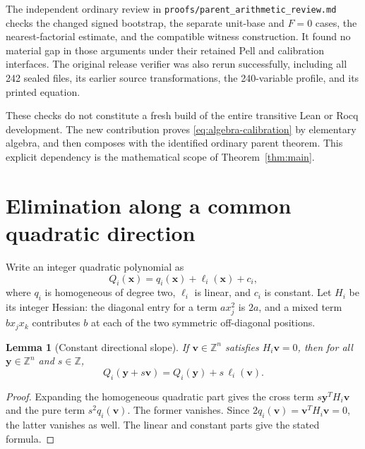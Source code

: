 \documentclass[10pt,letterpaper]{article}
\newtheorem{lemma}[theorem]{Lemma}
\theoremstyle{definition}\newtheorem{remark}[theorem]{Remark}
\newcommand{\Z}{\mathbb Z}\newcommand{\Q}{\mathbb Q}\newcommand{\N}{\mathbb N}
\begin{document}
The independent ordinary review in
\nolinkurl{proofs/parent_arithmetic_review.md} checks the changed signed
bootstrap, the separate unit-base and $F=0$ cases, the nearest-factorial
estimate, and the compatible witness construction. It found no material
gap in those arguments under their retained Pell and calibration
interfaces. The original release verifier was also rerun successfully,
including all 242 sealed files, its earlier source transformations, the
240-variable profile, and its printed equation.

These checks do not constitute a fresh build of the entire transitive
Lean or Rocq development. The new contribution proves
\eqref{eq:algebra-calibration} by elementary algebra, and then composes
with the identified ordinary parent theorem. This explicit dependency is
the mathematical scope of Theorem~\ref{thm:main}.

\section{Elimination along a common quadratic direction}

Write an integer quadratic polynomial as
\[
 Q_i(\boldsymbol x)=q_i(\boldsymbol x)+\ell_i(\boldsymbol x)+c_i,
\]
where $q_i$ is homogeneous of degree two, $\ell_i$ is linear, and $c_i$
is constant. Let $H_i$ be its integer Hessian: the diagonal entry for a
term $a x_j^2$ is $2a$, and a mixed term $b x_jx_k$ contributes $b$ at
each of the two symmetric off-diagonal positions.

\begin{lemma}[Constant directional slope]\label{lem:direction}
If $\boldsymbol v\in\Z^n$ satisfies $H_i\boldsymbol v=0$, then for all
$\boldsymbol y\in\Z^n$ and $s\in\Z$,
\[
 Q_i(\boldsymbol y+s\boldsymbol v)
      =Q_i(\boldsymbol y)+s\,\ell_i(\boldsymbol v).
\]
\end{lemma}
\begin{proof}
Expanding the homogeneous quadratic part gives the cross term
$s\boldsymbol y^TH_i\boldsymbol v$ and the pure term
$s^2q_i(\boldsymbol v)$. The former vanishes. Since
$2q_i(\boldsymbol v)=\boldsymbol v^TH_i\boldsymbol v=0$, the latter
vanishes as well. The linear and constant parts give the stated formula.
\end{proof}
\end{document}
